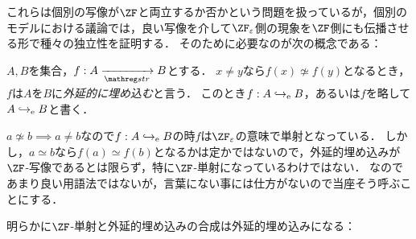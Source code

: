 \documentclass[realisability.tex]{subfiles}
\begin{document}
これらは個別の写像が$\ZF$と両立するか否かという問題を扱っているが，個別のモデルにおける議論では，良い写像を介して$\ZFe$側の現象を$\ZF$側にも伝播させる形で種々の独立性を証明する．
そのために必要なのが次の概念である：

\begin{definition}
 $A, B$を集合，$f: A \strto B$とする．
 $x \neq y$なら$f(x) \not\simeq f(y)$となるとき，$f$は$A$を$B$に\emph{外延的に埋め込む}と言う．
 このとき$f: A \hookrightarrow_{\mathrm{e}} B$，あるいは$f$を略して$A \hookrightarrow_{\mathrm{e}} B$と書く．
\end{definition}

\begin{remark}
 $a \not\simeq b \implies a \neq b$なので$f: A \hookrightarrow_{\mathrm{e}} B$の時$f$は$\ZFe$の意味で単射となっている．
 しかし，$a \simeq b$なら$f(a) \simeq f(b)$となるかは定かではないので，外延的埋め込みが$\ZF$-写像であるとは限らず，特に$\ZF$-単射になっているわけではない．
 なのであまり良い用語法ではないが，言葉にない事には仕方がないので当座そう呼ぶことにする．
\end{remark}

明らかに$\ZF$-単射と外延的埋め込みの合成は外延的埋め込みになる：
\end{document}
